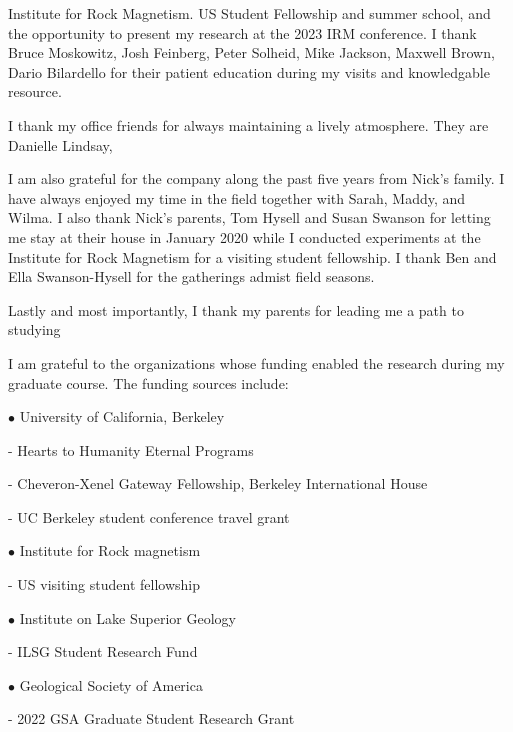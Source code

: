 \documentclass{ucbthesis}
\begin{document}
\begin{frontmatter}
\begin{acknowledgements}
Institute for Rock Magnetism. US Student Fellowship and summer school, and the opportunity to present my research at the 2023 IRM conference. I thank Bruce Moskowitz, Josh Feinberg, Peter Solheid, Mike Jackson, Maxwell Brown, Dario Bilardello for their patient education during my visits and knowledgable resource. 


I thank my office friends for always maintaining a lively atmosphere. They are Danielle Lindsay, 

I am also grateful for the company along the past five years from Nick's family. I have always enjoyed my time in the field together with Sarah, Maddy, and Wilma. I also thank Nick's parents, Tom Hysell and Susan Swanson for letting me stay at their house in January 2020 while I conducted experiments at the Institute for Rock Magnetism for a visiting student fellowship. I thank Ben and Ella Swanson-Hysell for the gatherings admist field seasons. 

Lastly and most importantly, I thank my parents for leading me a path to studying 

I am grateful to the organizations whose funding enabled the research during my graduate course. The funding sources include:

$\bullet$ University of California, Berkeley
    \vspace{5mm}

    - Hearts to Humanity Eternal Programs
    \vspace{5mm}
    
    - Cheveron-Xenel Gateway Fellowship, Berkeley International House
    \vspace{5mm}
    
    - UC Berkeley student conference travel grant
\vspace{5mm}

$\bullet$ Institute for Rock magnetism
    \vspace{5mm}
    
    - US visiting student fellowship
    \vspace{5mm}
    
$\bullet$ Institute on Lake Superior Geology
    \vspace{5mm}
    
    - ILSG Student Research Fund
    \vspace{5mm}
    
$\bullet$ Geological Society of America
    \vspace{5mm}
    
    - 2022 GSA Graduate Student Research Grant 
    \vspace{5mm}
    

\end{acknowledgements}
\end{frontmatter}
\end{document}
